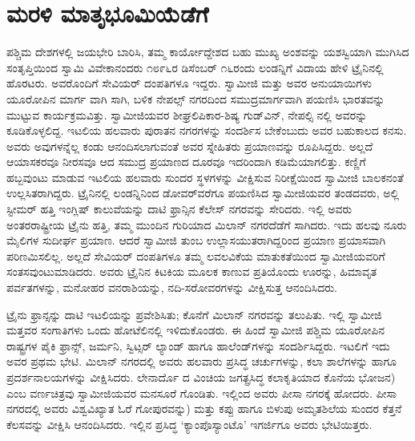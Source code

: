 
\chapter{ಮರಳಿ ಮಾತೃಭೂಮಿಯೆಡೆಗೆ}

\noindent

ಪಶ್ಚಿಮ ದೇಶಗಳಲ್ಲಿ ಜಯಭೇರಿ ಬಾರಿಸಿ, ತಮ್ಮ ಕಾರ್ಯೋದ್ದೇಶದ ಬಹು ಮುಖ್ಯ ಅಂಶವನ್ನು ಯಶಸ್ವಿಯಾಗಿ ಮುಗಿಸಿದ ಸಂತೃಪ್ತಿಯಿಂದ ಸ್ವಾಮಿ ವಿವೇಕಾನಂದರು ೧೮೯೬ರ ಡಿಸೆಂಬರ್ ೧೬ರಂದು ಲಂಡನ್ನಿಗೆ ವಿದಾಯ ಹೇಳಿ ಟ್ರೈನಿನಲ್ಲಿ ಹೊರಟರು. ಅವರೊಂದಿಗೆ ಸೇವಿಯರ್ ದಂಪತಿಗಳೂ ಇದ್ದರು. ಸ್ವಾಮೀಜಿ ಮತ್ತು ಅವರ ಅನುಯಾಯಿಗಳು ಯೂರೋಪಿನ ಮಾರ್ಗ ವಾಗಿ ಸಾಗಿ, ಬಳಿಕ ನೇಪಲ್ಸ್ ನಗರದಿಂದ ಸಮುದ್ರಮಾರ್ಗವಾಗಿ ಪಯಣಿಸಿ ಭಾರತವನ್ನು ಮುಟ್ಟುವ ಕಾರ್ಯಕ್ರಮವಿತ್ತು. ಸ್ವಾಮೀಜಿಯವರ ಶೀಘ್ರಲಿಪಿಕಾರ-ಶಿಷ್ಯ ಗುಡ್​ವಿನ್, ನೇಪಲ್ಸಿ ನಲ್ಲಿ ಅವರನ್ನು ಕೂಡಿಕೊಳ್ಳಲಿದ್ದ. ಇಟಲಿಯ ಹಲವಾರು ಪುರಾತನ ನಗರಗಳನ್ನು ಸಂದರ್ಶಿಸ ಬೇಕೆಂಬುದು ಅವರ ಬಹುಕಾಲದ ಕನಸು. ಅವರು ಅವುಗಳನ್ನೆಲ್ಲ ಕಂಡು ಆನಂದಿಸಲಾಗುವಂತೆ ಅವರ ಸ್ನೇಹಿತರು ಪ್ರಯಾಣವನ್ನು ರೂಪಿಸಿದ್ದರು. ಅಲ್ಲದೆ ಆಯಾಸಕರವೂ ನೀರಸವೂ ಆದ ಸಮುದ್ರ ಪ್ರಯಾಣದ ದೂರವೂ ಇದರಿಂದಾಗಿ ಕಡಿಮೆಯಾಗಲಿತ್ತು. ಕಣ್ಣಿಗೆ ಹಬ್ಬವುಂಟು ಮಾಡುವ ಇಟಲಿಯ ಹಲವಾರು ಸುಂದರ ಸ್ಥಳಗಳನ್ನು ವೀಕ್ಷಿಸುವ ನಿರೀಕ್ಷೆಯಿಂದ ಸ್ವಾಮೀಜಿ ಬಾಲಕನಂತೆ ಉಲ್ಲಸಿತರಾಗಿದ್ದರು. ಟ್ರೈನಿನಲ್ಲಿ ಲಂಡನ್ನಿನಿಂದ ಡೋವರ್​ವರೆಗೂ ಪಯಣಿಸಿದ ಸ್ವಾಮೀಜಿಯವರ ತಂಡದವರು, ಅಲ್ಲಿ ಸ್ಟೀಮರ್ ಹತ್ತಿ ಇಂಗ್ಲಿಷ್ ಕಾಲುವೆಯನ್ನು ದಾಟಿ ಫ್ರಾನ್ಸಿನ ಕೆಲೇಸ್ ನಗರವನ್ನು ಸೇರಿದರು. ಇಲ್ಲಿ ಅವರು ಅಂತರರಾಷ್ಟ್ರೀಯ ಟ್ರೈನು ಹತ್ತಿ, ತಮ್ಮ ಮುಂದಿನ ಗುರಿಯಾದ ಮಿಲಾನ್ ನಗರದೆಡೆಗೆ ಸಾಗಿದರು. ಇದು ಹಲವು ನೂರು ಮೈಲಿಗಳ ಸುದೀರ್ಘ ಪ್ರಯಾಣ. ಆದರೆ ಸ್ವಾಮೀಜಿ ತುಂಬ ಉಲ್ಲಾಸಯುತರಾಗಿದ್ದರಿಂದ ಪ್ರಯಾಣ ಪ್ರಯಾಸವಾಗಿ ಪರಿಣಮಿಸಲಿಲ್ಲ. ಅಲ್ಲದೆ ಸೇವಿಯರ್ ದಂಪತಿಗಳೂ ತಮ್ಮ ಲವಲವಿಕೆಯ ಮಾತುಕತೆಯಿಂದ ಸ್ವಾಮೀಜಿಯವರಿಗೆ ಸಂತಸವುಂಟುಮಾಡಿದರು. ಅವರು ಟ್ರೈನಿನ ಕಿಟಕಿಯ ಮೂಲಕ ಕಾಣುವ ಪ್ರತಿಯೊಂದು ಊರನ್ನು, ಹಿಮಾವೃತ ಪರ್ವತಗಳನ್ನು, ಮನೋಹರ ವನರಾಶಿಯನ್ನು, ನದಿ-ಸರೋವರಗಳನ್ನು ವೀಕ್ಷಿಸುತ್ತ ಆನಂದಿಸಿದರು.

ಟ್ರೈನು ಫ್ರಾನ್ಸನ್ನು ದಾಟಿ ಇಟಲಿಯನ್ನು ಪ್ರವೇಶಿಸಿತು; ಕೊನೆಗೆ ಮಿಲಾನ್ ನಗರವನ್ನು ತಲುಪಿತು. ಇಲ್ಲಿ ಸ್ವಾಮೀಜಿ ಮತ್ತವರ ಸಂಗಾತಿಗಳು ಒಂದು ಹೋಟೆಲಿನಲ್ಲಿ ಇಳಿದುಕೊಂಡರು. ಈ ಹಿಂದೆ ಸ್ವಾಮೀಜಿ ಪಶ್ಚಿಮ ಯೂರೋಪಿನ ರಾಷ್ಟ್ರಗಳ ಪೈಕಿ ಫ್ರಾನ್ಸ್, ಜರ್ಮನಿ, ಸ್ವಿಟ್ಸರ್ ಲ್ಯಾಂಡ್ ಹಾಗೂ ಹಾಲೆಂಡ್​ಗಳನ್ನು ಸಂದರ್ಶಿಸಿದ್ದರು. ಇಟಲಿಗೆ ಇದು ಅವರ ಪ್ರಥಮ ಭೇಟಿ. ಮಿಲಾನ್ ನಗರದಲ್ಲಿ ಅವರು ಹಲವಾರು ಪ್ರಸಿದ್ಧ ಚರ್ಚುಗಳನ್ನು, ಕಲಾ ಶಾಲೆಗಳನ್ನು ಹಾಗೂ ಪ್ರದರ್ಶನಾಲಯಗಳನ್ನು ವೀಕ್ಷಿಸಿದರು. ಲೇನಾರ್ದೊ ದ ವಿಂಚಿಯ ಜಗತ್ಪ್ರಸಿದ್ಧ ಕಲಾಕೃತಿಯಾದ ಕೊನೆಯ ಭೋಜನ) ಎಂಬ ವರ್ಣಚಿತ್ರವು ಸ್ವಾಮೀಜಿಯವರ ಮನಸೂರೆ ಗೊಂಡಿತು. ಇಲ್ಲಿಂದ ಅವರು ಪೀಸಾ ನಗರಕ್ಕೆ ಹೋದರು. ಪೀಸಾ ನಗರದಲ್ಲಿ ಅವರು ವಿಶ್ವವಿಖ್ಯಾತ ಓರೆ ಗೋಪುರವನ್ನು) ಮತ್ತು ಕಪ್ಪು ಹಾಗೂ ಬಿಳುಪು ಅಮೃತಶಿಲೆಯ ಸುಂದರ ಕೆತ್ತನೆ ಕೆಲಸವನ್ನು ವೀಕ್ಷಿಸಿ ಆನಂದಿಸಿದರು. ಇಲ್ಲಿನ ಪ್ರಸಿದ್ಧ ‘ಕ್ಯಾಂಪೊಸ್ಯಾಂಟೊ’ ಇಗರ್ಜಿಗೂ ಅವರು ಭೇಟಿಯಿತ್ತರು.

